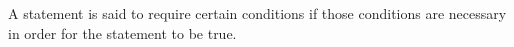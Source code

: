 A statement is said to require certain conditions
if those conditions are necessary in order for 
the statement to be true.